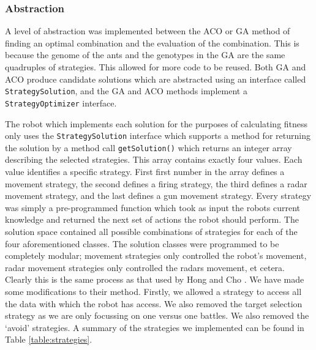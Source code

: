 

\subsubsection{Abstraction}
A level of abstraction was implemented between the ACO or GA method of finding an optimal combination and the evaluation of the combination. This is because the genome of the ants and the genotypes in the GA are the same quadruples of strategies. This allowed for more code to be reused. Both GA and ACO produce candidate solutions which are abstracted using an interface called \texttt{StrategySolution}, and the GA and ACO methods implement a \texttt{StrategyOptimizer} interface.

The robot which implements each solution for the purposes of calculating fitness only uses the \texttt{StrategySolution} interface which supports a method for returning the solution by a method call \texttt{getSolution()} which returns an integer array describing the selected strategies. This array contains exactly four values. Each value identifies a specific strategy. First first number in the array defines a movement strategy, the second defines a firing strategy, the third defines a radar movement strategy, and the last defines a gun movement strategy. Every strategy was simply a pre-programmed function which took as input the robots current knowledge and returned the next set of actions the robot should perform. The solution space contained all possible combinations of strategies for each of the four aforementioned classes. The solution classes were programmed to be completely modular; movement strategies only controlled the robot's movement, radar movement strategies only controlled the radars movement, et cetera. Clearly this is the same process as that used by Hong and Cho \cite{emergentbehaviours}. We have made some modifications to their method. Firstly, we allowed a strategy to access all the data with which the robot has access. We also removed the target selection strategy as we are only focussing on one versus one battles. We also removed the `avoid' strategies. A summary of the strategies we implemented can be found in Table \ref{table:strategies}.

